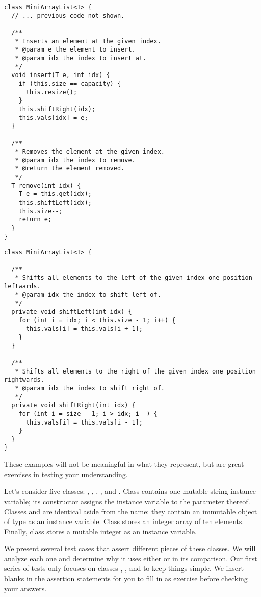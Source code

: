 \begin{lstlisting}[language=MyJava]
class MiniArrayList<T> {
  // ... previous code not shown.

  /**
   * Inserts an element at the given index.
   * @param e the element to insert.
   * @param idx the index to insert at.
   */
  void insert(T e, int idx) {
    if (this.size == capacity) { 
      this.resize(); 
    }
    this.shiftRight(idx);
    this.vals[idx] = e;
  }

  /**
   * Removes the element at the given index.
   * @param idx the index to remove.
   * @return the element removed.
   */
  T remove(int idx) {
    T e = this.get(idx);
    this.shiftLeft(idx);
    this.size--;
    return e;
  }
}
\end{lstlisting}

\begin{lstlisting}[language=MyJava]
class MiniArrayList<T> {

  /**
   * Shifts all elements to the left of the given index one position leftwards.
   * @param idx the index to shift left of.
   */
  private void shiftLeft(int idx) {
    for (int i = idx; i < this.size - 1; i++) { 
      this.vals[i] = this.vals[i + 1]; 
    }
  }

  /**
   * Shifts all elements to the right of the given index one position rightwards.
   * @param idx the index to shift right of.
   */
  private void shiftRight(int idx) {
    for (int i = size - 1; i > idx; i--) { 
      this.vals[i] = this.vals[i - 1]; 
    }
  }
}
\end{lstlisting}

These examples will not be meaningful in what they represent, but are great exercises in testing your understanding. 

Let's consider five classes: , , , , and . 
Class  contains one mutable string instance variable; its constructor assigns the instance variable to the parameter thereof. 
Classes  and  are identical aside from the name: they contain an immutable object of type  as an instance variable. 
Class  stores an integer array of ten elements. 
Finally, class  stores a mutable integer as an instance variable.

We present several test cases that assert different pieces of these classes. 
We will analyze each one and determine why it uses either  or  in its comparison. 
Our first series of tests only focuses on classes , , and  to keep things simple. 
We insert blanks in the assertion statements for you to fill in as exercise before checking your answers.


